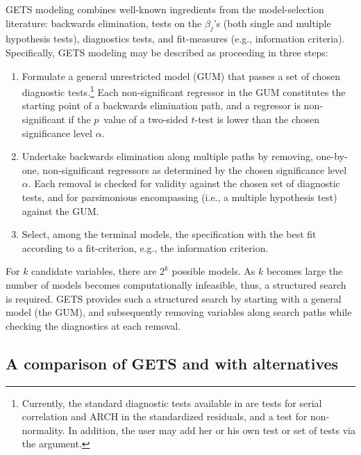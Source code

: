 \documentclass[article,nojss]{jss}
\begin{document}
GETS modeling combines well-known ingredients from the model-selection literature: backwards elimination, tests on the $\beta_j$'s (both single and multiple hypothesis tests), diagnostics tests, and fit-measures (e.g., information criteria). Specifically, GETS modeling may be described as proceeding in three steps:

\begin{enumerate}
	\item Formulate a general unrestricted model (GUM) that passes a set of chosen diagnostic tests.\footnote{Currently, the standard diagnostic tests available in  are tests for serial correlation and ARCH in the standardized residuals, and a test for non-normality. In addition, the user may add her or his own test or set of tests via the  argument.} Each non-significant regressor in the GUM constitutes the starting point of a backwards elimination path, and a regressor is non-significant if the $p$~value of a two-sided $t$-test is lower than the chosen significance level $\alpha$.
	
	\item Undertake backwards elimination along multiple paths by removing, one-by-one, non-significant regressors as determined by the chosen significance level $\alpha$. Each removal is checked for validity against the chosen set of diagnostic tests, and for parsimonious encompassing (i.e., a multiple hypothesis test) against the GUM.
	
	\item Select, among the terminal models, the specification with the best fit according to a fit-criterion, e.g., the \cite{Schwarz1978} information criterion. 
\end{enumerate}

For $k$ candidate variables, there are $2^k$ possible models. As $k$ becomes large the number of models becomes computationally infeasible, thus, a structured search is required. GETS provides such a structured search by starting with a general model (the GUM), and subsequently removing variables along search paths while checking the diagnostics at each removal.

\subsection[A comparison of GETS and gets with alternatives]{A comparison of GETS and  with alternatives}
\label{subsec:comparison:of:gets:with:alternatives}
\end{document}

